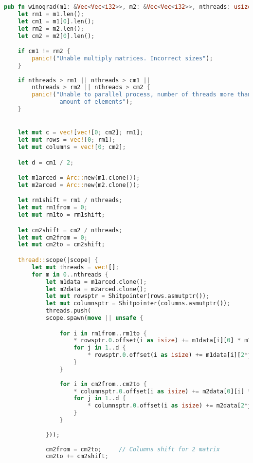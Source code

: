 \begin{lstlisting}[language=Rust, caption={ Реализация алгоритма Винограда умножения матриц с  использованием параллелизма},
                    label={list:Mwinograd}]
pub fn winograd(m1: &Vec<Vec<i32>>, m2: &Vec<Vec<i32>>, nthreads: usize) -> Vec<Vec<i32>> {
    let rm1 = m1.len();
    let cm1 = m1[0].len();
    let rm2 = m2.len();
    let cm2 = m2[0].len();

    if cm1 != rm2 {
        panic!("Unable multiply matrices. Incorrect sizes");
    }
    
    if nthreads > rm1 || nthreads > cm1 ||
        nthreads > rm2 || nthreads > cm2 {
        panic!("Unable to parallel process, number of threads more than
                amount of elements");
    }


    let mut c = vec![vec![0; cm2]; rm1];
    let mut rows = vec![0; rm1];
    let mut columns = vec![0; cm2];

    let d = cm1 / 2;

    let m1arced = Arc::new(m1.clone()); 
    let m2arced = Arc::new(m2.clone()); 

    let rm1shift = rm1 / nthreads;
    let mut rm1from = 0;
    let mut rm1to = rm1shift;

    let cm2shift = cm2 / nthreads;
    let mut cm2from = 0;
    let mut cm2to = cm2shift;

    thread::scope(|scope| {
        let mut threads = vec![];
        for m in 0..nthreads {
            let m1data = m1arced.clone();
            let m2data = m2arced.clone();
            let mut rowsptr = Shitpointer(rows.asmutptr());
            let mut columnsptr = Shitpointer(columns.asmutptr());
            threads.push(
            scope.spawn(move || unsafe { 

                for i in rm1from..rm1to {
                    * rowsptr.0.offset(i as isize) += m1data[i][0] * m1data[i][1];
                    for j in 1..d {
                        * rowsptr.0.offset(i as isize) += m1data[i][2*j] * m1data[i][2*j+1];
                    }
                }
    
                for i in cm2from..cm2to {
                    * columnsptr.0.offset(i as isize) += m2data[0][i] * m2data[1][i];
                    for j in 1..d {
                        * columnsptr.0.offset(i as isize) += m2data[2*j][i] * m2data[2*j+1][i];
                    }
                }
            
            }));
    
            cm2from = cm2to;     // Columns shift for 2 matrix
            cm2to += cm2shift;
    

\end{lstlisting}
